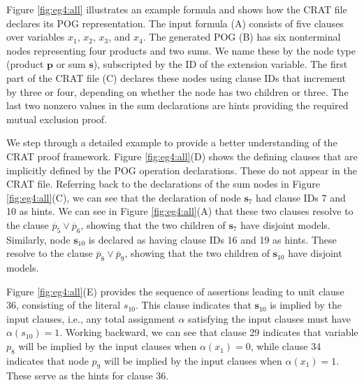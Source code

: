 \documentclass[letterpaper,USenglish,cleveref, autoref, thm-restate]{lipics-v2021}
\newcommand{\obar}[1]{\overline{#1}}
\newcommand{\assign}{\alpha}
\newcommand{\makenode}[1]{\mathbf{#1}}
\newcommand{\nodes}{\makenode{s}}
\newcommand{\nodep}{\makenode{p}}
\begin{document}
Figure \ref{fig:eg4:all} illustrates an example formula and shows how
the CRAT file declares its POG representation.  The input formula (A)
consists of five clauses over variables $x_1$, $x_2$, $x_3$, and
$x_4$.  The generated POG (B) has six nonterminal nodes representing
four products and two sums.  We name these by the node
type (product $\nodep$ or sum $\nodes$), subscripted by the ID of the
extension variable.
  The first part of the CRAT file (C) declares
these nodes using clause IDs that increment by three or four,
depending on whether the node has two children or three.  The last two
nonzero values in the sum declarations are hints providing the
required mutual exclusion proof.

We step through a detailed example to provide a better understanding of the CRAT proof framework.
Figure
\ref{fig:eg4:all}(D) shows the defining clauses that are implicitly
defined by the POG operation declarations.  These do not appear in the
CRAT file.  Referring back to the declarations of the sum nodes in
Figure \ref{fig:eg4:all}(C), we can see that the declaration of node
$\nodes_7$ had clause IDs 7 and 10 as hints.  We can see in Figure
\ref{fig:eg4:all}(A) that these two clauses resolve to the clause
$\obar{p}_5 \lor \obar{p}_6$, showing that the two children of $\nodes_7$
have disjoint models.  Similarly, node $\nodes_{10}$ is declared as having
clause IDs 16 and 19 as hints.  These resolve to the clause
$\obar{p}_8 \lor \obar{p}_9$, showing that the two children of
$\nodes_{10}$ have disjoint models.

Figure \ref{fig:eg4:all}(E) provides the sequence of assertions
leading to unit clause 36, consisting of the literal $s_{10}$.  This clause indicates that $\nodes_{10}$ is implied by the input clauses, i.e.,
any total assignment $\assign$
satisfying the input clauses must have $\assign(s_{10}) = 1$.
Working backward, we can see that
clause 29 indicates that variable $p_8$ will be implied by the input
clauses when $\assign(x_1) = 0$, while clause 34 indicates that node $p_9$ will
be implied by the input clauses when $\assign(x_1) = 1$.  These serve as the
hints for clause 36.
\end{document}
